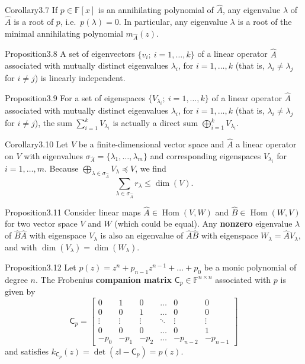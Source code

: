 \begin{res}{Corollary}{3.7}
If $p\in\mathbb F[x]$ is an annihilating polynomial of $\hat A$, any eigenvalue $\lambda$ of $\hat A$ is a root of $p$, i.e.\ $p(\lambda)=0$. In particular, any eigenvalue $\lambda$ is a root of the minimal annihilating polynomial $m_{\hat A}(z)$.
\end{res}

\begin{res}{Proposition}{3.8}
A set of eigenvectors $\{v_i;\ i=1,\dots,k\}$ of a linear operator $\hat A$ associated with mutually distinct eigenvalues $\lambda_i$, for $i=1,\dots,k$ (that is, $\lambda_i\ne\lambda_j$ for $i\ne j$) is linearly independent.
\end{res}

\begin{res}{Proposition}{3.9}
For a set of eigenspaces $\{V_{\lambda_i};\ i=1,\dots,k\}$ of a linear operator $\hat A$ associated with mutually distinct eigenvalues $\lambda_i$, for $i=1,\dots,k$ (that is, $\lambda_i\ne\lambda_j$ for $i\ne j$), the sum $\sum_{i=1}^kV_{\lambda_i}$ is actually a direct sum $\bigoplus_{i=1}^kV_{\lambda_i}$.
\end{res}

\begin{res}{Corollary}{3.10}
Let $V$ be a finite-dimensional vector space and $\hat A$ a linear operator on $V$ with eigenvalues $\sigma_{\hat A}=\{\lambda_1,\dots,\lambda_m\}$ and corresponding eigenspaces $V_{\lambda_i}$ for $i=1,\dots,m$. Because $\bigoplus_{\lambda\in\sigma_{\hat A}}V_\lambda\preccurlyeq V$, we find
\begin{equation}\sum_{\lambda\in\sigma_{\hat A}}r_\lambda\le\dim(V).\tag{3.12}\end{equation}
\end{res}

\begin{res}{Proposition}{3.11}
Consider linear maps $\hat A\in\operatorname{Hom}(V,W)$ and $\hat B\in\operatorname{Hom}(W,V)$ for two vector space $V$ and $W$ (which could be equal). Any \textbf{nonzero} eigenvalue $\lambda$ of $\hat B\hat A$ with eigenspace $V_\lambda$ is also an eigenvalue of $\hat A\hat B$ with eigenspace $W_\lambda=\hat AV_\lambda$, and with $\dim(V_\lambda)=\dim(W_\lambda)$.
\end{res}

\begin{res}{Proposition}{3.12}
Let $p(z)=z^n+p_{n-1}z^{n-1}+\ldots+p_0$ be a monic polynomial of degree $n$. The Frobenius \textbf{companion matrix} $\mathsf C_p\in\mathbb F^{n\times n}$ associated with $p$ is given by
\begin{equation}\mathsf C_p=\begin{bmatrix}0&1&0&\ldots&0&0\\0&0&1&\ldots&0&0\\\vdots&\vdots&\vdots&\ddots&\vdots&\vdots\\0&0&0&\ldots&0&1\\-p_0&-p_1&-p_2&\ldots&-p_{n-2}&-p_{n-1}\end{bmatrix}\tag{3.17}\end{equation}
and satisfies $k_{\mathsf C_p}(z)=\det(z\mathsf I-\mathsf C_p)=p(z)$.
\end{res}

